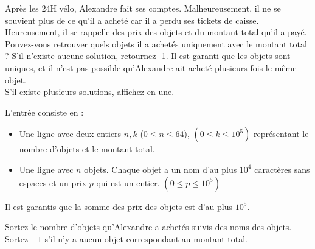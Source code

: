 \problemname{\problemyamlname}

\newcommand{\maxk}{10^5}
\newcommand{\maxn}{64}

Après les 24H vélo, Alexandre fait ses comptes. Malheureusement, il ne se souvient plus de ce qu'il a acheté car il a perdu ses tickets de caisse. Heureusement, il se rappelle des prix des objets et du montant total qu'il a payé. Pouvez-vous retrouver quels objets il a achetés uniquement avec le montant total ? S'il n'existe aucune solution, retournez -1. Il est garanti que les objets sont uniques, et il n'est pas possible qu'Alexandre ait acheté plusieurs fois le même objet. \\
S'il existe plusieurs solutions, affichez-en une.

\begin{Input}
    L'entrée consiste en :
    \begin{itemize}
        \item Une ligne avec deux entiers $n, k$ ($0 \leq n \leq \maxn$), $(0 \leq k \leq \maxk)$ représentant le nombre d'objets et le montant total.
        \item Une ligne avec $n$ objets. Chaque objet a un nom d'au plus $10^4$ caractères sans espaces et un prix $p$ qui est un entier. $(0 \leq p \leq \maxk)$
    \end{itemize}
    Il est garantis que la somme des prix des objets est d'au plus $10^5$.
\end{Input}

\begin{Output}
    Sortez le nombre d'objets qu'Alexandre a achetés suivis des noms des objets. Sortez $-1$ s'il n'y a aucun objet correspondant au montant total.
\end{Output}
